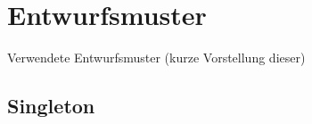 \section{Entwurfsmuster}
Verwendete Entwurfsmuster (kurze Vorstellung dieser)
\subsection{Singleton}
